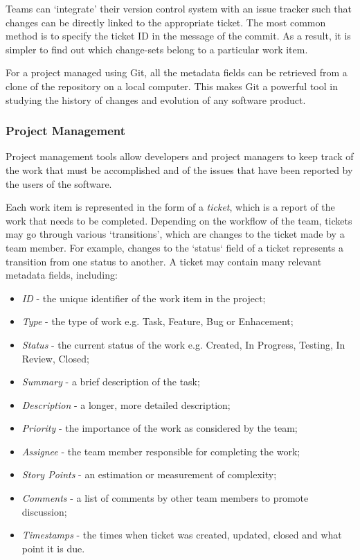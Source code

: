 \documentclass{mpaper}
\begin{document}
Teams can `integrate' their version control system with an issue tracker such
that changes can be directly linked to the appropriate ticket. The most common
method is to specify the ticket ID in the message of the commit. As a result, it
is simpler to find out which change-sets belong to a particular work item. 

For a project managed using Git, all the metadata fields can be retrieved from a
clone of the repository on a local computer. This makes Git a powerful tool in
studying the history of changes and evolution of any software product.

\subsubsection*{Project Management}
\label{project-management}

Project management tools allow developers and project managers to keep track of
the work that must be accomplished and of the issues that have been reported by
the users of the software. 

Each work item is represented in the form of a \emph{ticket}, which is a report
of the work that needs to be completed. Depending on the workflow of the team,
tickets may go through various `transitions', which are changes to the ticket
made by a team member. For example, changes to the `status` field of a ticket
represents a transition from one status to another. A ticket may contain many
relevant metadata fields, including:

\begin{itemize}
  \item \emph{ID} - the unique identifier of the work item in the project;
  \item \emph{Type} - the type of work e.g. Task, Feature, Bug or Enhacement;
  \item \emph{Status} - the current status of the work e.g. Created, In
  Progress, Testing, In Review, Closed;
  \item \emph{Summary} - a brief description of the task;
  \item \emph{Description} - a longer, more detailed description;
  \item \emph{Priority} - the importance of the work as considered by the team;
  \item \emph{Assignee} - the team member responsible for completing the work;
  \item \emph{Story Points} - an estimation or measurement of complexity;
  \item \emph{Comments} - a list of comments by other team members to promote
  discussion;
  \item \emph{Timestamps} - the times when ticket was created, updated, closed
  and what point it is due.
\end{itemize}
\end{document}
